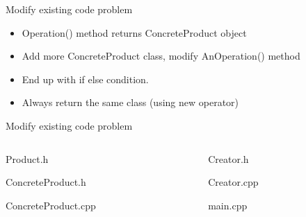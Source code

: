 \documentclass[13pt]{beamer}
\begin{document}
\begin{frame}{Modify existing code problem}
	\begin{center}
	\end{center}
	\begin{itemize}
	\item Operation() method returns ConcreteProduct object
	\item Add more ConcreteProduct class, modify AnOperation() method
	\item End up with if else condition.
	\item Always return the same class (using new operator)
	\end{itemize}
\end{frame}

\iffalse
\begin{frame}{Modify existing code problem}
\begin{columns}[T]
\begin{column}{.45\textwidth}
\lstset{basicstyle=\tiny,style=myCustomCppStyle}
Product.h

ConcreteProduct.h

ConcreteProduct.cpp

\end{column}

\begin{column}{.45\textwidth}
\lstset{basicstyle=\tiny,style=myCustomCppStyle}
Creator.h

Creator.cpp

main.cpp

\end{column}
\end{columns}
\end{frame}
\end{document}
